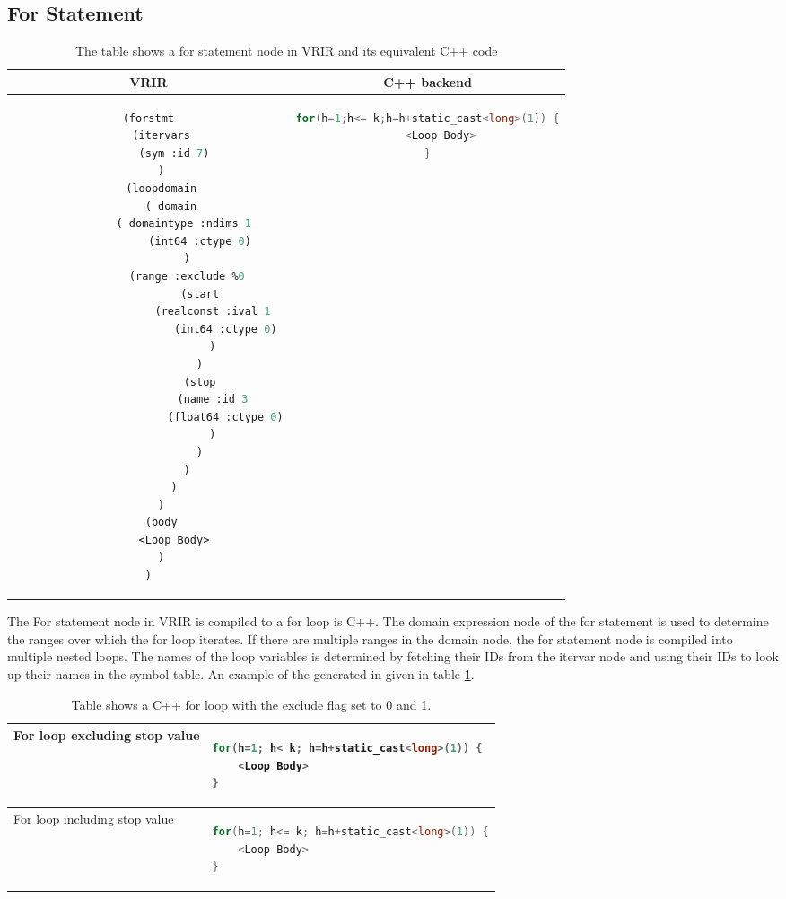 \subsection{For Statement}
\begin{table}[htbp]
\begin{tabular}{|c|c|}
\hline 
VRIR & C++ backend \\
\hline 
{
\begin{lstlisting}[language=lisp, frame=none, numbers=none]
(forstmt
	(itervars
		(sym :id 7)
	)
	(loopdomain
		( domain 
			( domaintype :ndims 1 
				(int64 :ctype 0)
			)
			(range :exclude %0
				(start
					(realconst :ival 1
						(int64 :ctype 0)
					)
				)
				(stop
					(name :id 3
						(float64 :ctype 0)
					)
				)
			)
		)
	)
	(body
		<Loop Body>
	)
)

\end{lstlisting}
} & 
{
\begin{lstlisting}[language=c,frame=none, numbers=none]
for(h=1;h<= k;h=h+static_cast<long>(1)) {
	<Loop Body>
}
\end{lstlisting}
} \\
\hline
\end{tabular}
\caption[For Statement]{The table shows a for statement node in VRIR and its equivalent C++ code}
\label{tab:forStmt}
\end{table}
The For statement node in VRIR is compiled to a for loop is C++. The domain expression node of the for statement is used to determine the ranges over which the for loop iterates. If there are multiple ranges in the domain node, the for statement node is compiled into multiple nested loops. The names of the loop variables is determined by fetching their IDs from the itervar node and using their IDs to look up their names in the symbol table. An example of the generated in given in table \ref{tab:forStmt}.
\begin{table}[htbp]
\begin{tabular}{|l|l|}
\hline

For loop excluding stop value & 
{
\begin{lstlisting}[language=c,frame=none, numbers=none]
for(h=1; h< k; h=h+static_cast<long>(1)) {
	<Loop Body>
}
\end{lstlisting}
}
 \\
\hline 

For loop including stop value & 
{
\begin{lstlisting}[language=c,frame=none, numbers=none]
for(h=1; h<= k; h=h+static_cast<long>(1)) {
	<Loop Body>
}
\end{lstlisting}
} \\
\hline
\end{tabular}
\caption[Use of exclude flag in For statement]{Table shows a C++ for loop with the exclude flag set to 0 and 1.}
\label{tab:excludeFor}
\end{table}
